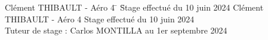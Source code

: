 \begin{titlepage}
    \begin{tabbing}
        Clément THIBAULT - Aéro 4 \= \hspace{6cm} \= Stage effectué du 10 juin 2024 \kill
        Clément THIBAULT - Aéro 4 \> \> Stage effectué du 10 juin 2024 \\
        Tuteur de stage : Carlos MONTILLA \> \> au 1er septembre 2024
    \end{tabbing}
    \vspace*{1cm}

\end{titlepage}